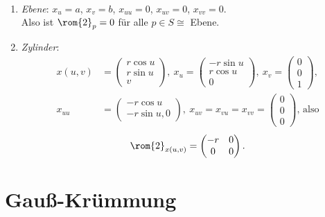 \begin{example}
  \
  \begin{enumerate}
    \item \emph{Ebene}: $ x_u = a $, $ x_v = b $, $ x_{uu} = 0 $, $ x_{ uv } = 0 $, $ x_{ vv } = 0 $. \\
      Also ist $ \rom{2}_p = 0 $ für alle $ p \in S \cong $ Ebene.
    \item \emph{Zylinder}:
    \begin{align*}
      x(u,v) &= \left( \begin{smallmatrix}
        r\cos u \\ r\sin u \\ v
      \end{smallmatrix} \right), \ x_u = \left( \begin{smallmatrix}
        -r\sin u \\ r\cos u \\ 0
      \end{smallmatrix} \right), \ x_v = \left( \begin{smallmatrix}
        0 \\ 0 \\ 1
      \end{smallmatrix} \right), \\
      x_{uu} &= \left( \begin{smallmatrix}
        -r\cos u \\ -r\sin u, 0
      \end{smallmatrix} \right), \ x_{uv} = x_{vu} = x_{vv} = \left( \begin{smallmatrix}
         0 \\ 0 \\ 0
      \end{smallmatrix} \right)\text{, also}
    \end{align*}
    \begin{equation*}
      \rom{2}_{x(u,v)} = \begin{pmatrix}
        -r & 0 \\
        0 & 0
      \end{pmatrix}\text{.}
    \end{equation*}
  \end{enumerate}
\end{example}

\section{Gauß-Krümmung}

